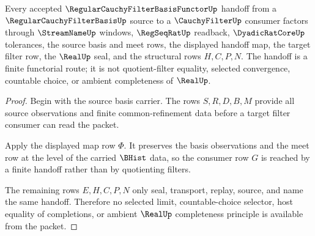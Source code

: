 \begin{theorem}
\label{thm:regular-cauchy-filter-basis-functor-finite-handoff-scope}
Every accepted $\RegularCauchyFilterBasisFunctorUp$ handoff from a $\RegularCauchyFilterBasisUp$ source to a $\CauchyFilterUp$ consumer factors through $\StreamNameUp$ windows, $\RegSeqRatUp$ readback, $\DyadicRatCoreUp$ tolerances, the source basis and meet rows, the displayed handoff map, the target filter row, the $\RealUp$ seal, and the structural rows $H,C,P,N$. The handoff is a finite functorial route; it is not quotient-filter equality, selected convergence, countable choice, or ambient completeness of $\RealUp$.
\end{theorem}
\begin{proof}
Begin with the source basis carrier. The rows $S,R,D,B,M$ provide all source observations and finite common-refinement data before a target filter consumer can read the packet.

Apply the displayed map row $\Phi$. It preserves the basis observations and the meet row at the level of the carried $\BHist$ data, so the consumer row $G$ is reached by a finite handoff rather than by quotienting filters.

The remaining rows $E,H,C,P,N$ only seal, transport, replay, source, and name the same handoff. Therefore no selected limit, countable-choice selector, host equality of completions, or ambient $\RealUp$ completeness principle is available from the packet.
\end{proof}



